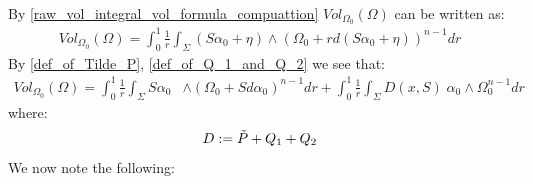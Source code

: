 \documentclass[11pt]{amsart}
\theoremstyle{plain}
\theoremstyle{definition}
\theoremstyle{remark}
\begin{document}
\\
By \eqref{raw_vol_integral_vol_formula_compuattion} $Vol_{\Omega_0}(\Omega)$ can be written as:
\begin{align}
    Vol_{\Omega_0}(\Omega) =    \int^1_0 \frac{1}{r} \int_{\Sigma} (S\alpha_0 + \eta) \wedge (\Omega_0 + r d(S\alpha_0 + \eta ))^{n-1} dr 
\end{align}
By \eqref{def_of_Tilde_P}, \eqref{def_of_Q_1_and_Q_2} we see that:
\begin{align}
    Vol_{\Omega_0}(\Omega) = \int^1_0 \frac{1}{r}\int_{\Sigma}  S\alpha_0 &\wedge (\Omega_0 +Sd\alpha_0)^{n-1} dr + \int^1_0 \frac{1}{r} \int_{\Sigma} D(x,S) \; \alpha_0 \wedge \Omega^{n-1}_0 dr
\end{align}
where:
\begin{align}\label{def_of_D}
    D:= \Tilde{P}+Q_1+Q_2
\end{align}
We now note the following:
\end{document}
